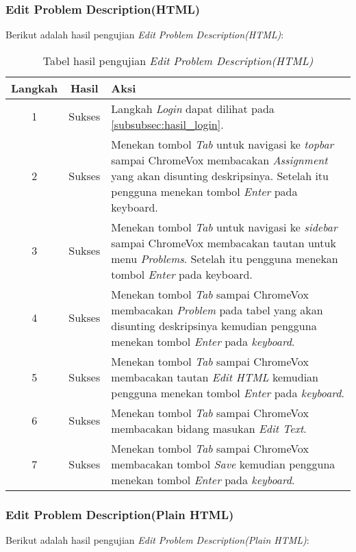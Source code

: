 \subsubsection{Edit Problem Description(HTML)}
\label{subsubsec:hasil_edit_problem_description_html}
Berikut adalah hasil pengujian \textit{Edit Problem Description(HTML)}:

\begin{table}[H]
	\centering
	\caption{Tabel hasil pengujian \textit{Edit Problem Description(HTML)}}
	\label{tab:hasil_edit_problem_description_html}
	\begin{tabular}{|c|c|p{12cm}|}
		\toprule
		Langkah & Hasil & Aksi\\
		\midrule
		1 & Sukses & Langkah \textit{Login} dapat dilihat pada \ref{subsubsec:hasil_login}.\\
		2 & Sukses & Menekan tombol \textit{Tab} untuk navigasi ke \textit{topbar} sampai ChromeVox membacakan \textit{Assignment} yang akan disunting deskripsinya. Setelah itu pengguna menekan tombol \textit{Enter} pada keyboard.\\
		3 & Sukses & Menekan tombol \textit{Tab} untuk navigasi ke \textit{sidebar} sampai ChromeVox membacakan tautan untuk menu \textit{Problems}. Setelah itu pengguna menekan tombol \textit{Enter} pada keyboard.\\
		4 & Sukses & Menekan tombol \textit{Tab} sampai ChromeVox membacakan \textit{Problem} pada tabel yang akan disunting deskripsinya kemudian pengguna menekan tombol \textit{Enter} pada \textit{keyboard}.\\
		5 & Sukses & Menekan tombol \textit{Tab} sampai ChromeVox membacakan tautan \textit{Edit HTML} kemudian pengguna menekan tombol \textit{Enter} pada \textit{keyboard}.\\
		6 & Sukses & Menekan tombol \textit{Tab} sampai ChromeVox membacakan bidang masukan \textit{Edit Text}.\\
		7 & Sukses & Menekan tombol \textit{Tab} sampai ChromeVox membacakan tombol \textit{Save} kemudian pengguna menekan tombol \textit{Enter} pada \textit{keyboard}.\\
		\bottomrule
	\end{tabular}
\end{table}

\subsubsection{Edit Problem Description(Plain HTML)}
\label{subsubsec:hasil_edit_problem_description_plain_html}
Berikut adalah hasil pengujian \textit{Edit Problem Description(Plain HTML)}:

